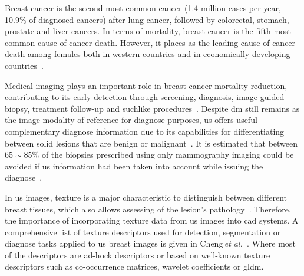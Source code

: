 \documentclass[a4paper, 10pt, conference]{llncs}      %
\begin{document}
Breast cancer is the second most common cancer (1.4 million cases per year, 10.9\% of  diagnosed cancers) after lung cancer, followed by colorectal, stomach, prostate and liver cancers. 
In terms of mortality, breast cancer is the fifth most common cause of cancer death. However, it places as the leading cause of cancer death among females both in western countries and in economically developing countries~\cite{cancerStatistics2011}.

Medical imaging plays an important role in breast cancer mortality reduction, contributing to its early detection through screening, diagnosis, image-guided biopsy, treatment follow-up and suchlike procedures~\cite{smith2003american}.
Despite \ac{dm} still remains as the image modality of reference for diagnose purposes, \ac{us} offers useful complementary  diagnose information due to its capabilities for differentiating between solid lesions that are benign or malignant~\cite{stavros2004breast}. It is estimated that between $65\sim85\%$ of the biopsies prescribed using only mammography imaging could be avoided if \ac{us} information had been taken into account while issuing the diagnose~\cite{yuan2010multimodality}. 



In \ac{us} images, texture is a major characteristic to distinguish between different breast tissues, which also allows assessing of the lesion's pathology~\cite{stavros2004breast}.  Therefore, the importance of incorporating texture data from  \ac{us} images into \ac{cad} systems. A comprehensive list of texture descriptors used for detection, segmentation or diagnose tasks applied to \ac{us} breast images is given in Cheng\,\emph{et al.}~\cite{Cheng:2009p10580}. Where most of the descriptors are ad-hock descriptors or based on well-known texture descriptors such as co-occurrence matrices, wavelet coefficients or \ac{gldm}.
\end{document}
